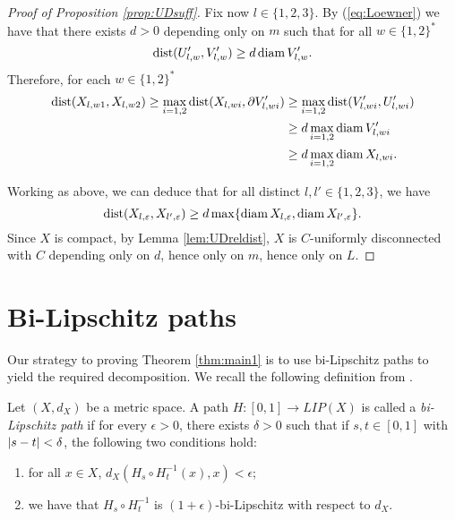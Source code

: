 \documentclass{amsart}
\DeclareMathOperator{\dist}{dist}
\begin{document}
\begin{proof}[{Proof of Proposition \ref{prop:UDsuff}}]
Fix now $l\in\{1,2,3\}$.
By (\ref{eq:Loewner}) we have that there exists $d>0$ depending only on $m$ such that for all $w\in\{1,2\}^*$
\begin{equation*} 
\dist(U_{l,w}',V_{l,w}') \geq d\diam{V_{l,w}'}.
\end{equation*}
Therefore, for each $w\in\{1,2\}^*$
\begin{align*} 
\dist(X_{l,w1},X_{l,w2})  \geq \max_{i=1,2} \dist(X_{l,wi},\partial V_{l,wi}') &\geq  \max_{i=1,2}\dist(V_{l,wi}', U_{l,wi}')\\
&\geq d\max_{i=1,2}\diam{V_{l,wi}'}  \\
&\geq d\max_{i=1,2} \diam{X_{l,wi}}.
\end{align*}

Working as above, we can deduce that for all distinct $l,l'\in\{1,2,3\}$, we have
\[ \dist(X_{l,\varepsilon},X_{l',\varepsilon}) \geq d \max\{ \diam{X_{l,\varepsilon}}, \diam{X_{l',\varepsilon}}\}.\]
Since $X$ is compact, by Lemma \ref{lem:UDreldist}, $X$ is $C$-uniformly disconnected with $C$ depending only on $d$, hence only on $m$, hence only on $L$. 
\end{proof}




\section{Bi-Lipschitz paths}\label{sec:BLpaths}

Our strategy to proving Theorem \ref{thm:main1} is to use bi-Lipschitz paths to yield the required decomposition.
We recall the following definition from \cite{FM}.

\begin{definition}
\label{bilippath}
Let $(X,d_{X})$ be a metric space.
A path $H:[0,1] \rightarrow LIP(X)$
is called a \emph{bi-Lipschitz path} if for every $\epsilon >0$, there exists $\delta >0$ such that if $s,t \in [0,1]$ with $\arrowvert s-t \arrowvert < \delta$, the following two conditions hold:
\begin{enumerate}
\item for all $x \in X$, $d_{X}(H_{s} \circ H_{t}^{-1}(x),x) <\epsilon$;
\item we have that $H_{s} \circ H_{t}^{-1}$ is $(1+\epsilon)$-bi-Lipschitz with respect to $d_{X}$.
\end{enumerate}
\end{definition}
\end{document}
